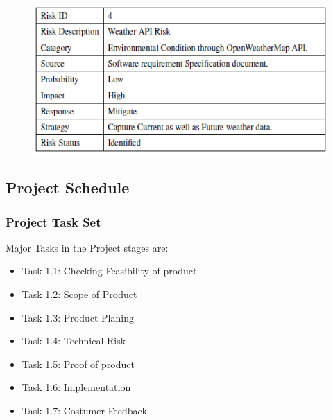 \begin{figure}[h!]
	\centering
	\includegraphics[width=.95\linewidth]{./r6}		
	\end{figure}

\subsection{Project Schedule}

\subsubsection{Project Task Set}
Major Tasks in the Project stages are:\\
\begin{itemize}
	\item Task 1.1: Checking Feasibility of product
	\item Task 1.2: Scope of Product
	\item Task 1.3: Product Planing
	\item Task 1.4: Technical Risk
	\item Task 1.5: Proof of product
	\item Task 1.6: Implementation
	\item Task 1.7: Costumer Feedback
\end{itemize}
\newpage
